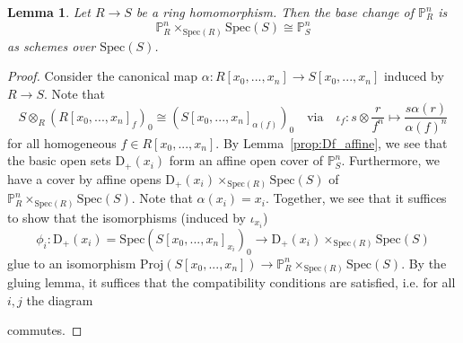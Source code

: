 \documentclass{scrartcl}
\newcommand{\D}[1]{\mathrm{D}_+(#1)}
\renewcommand{\P}{\mathbb{P}}
\newcommand{\Spec}{\mathrm{Spec}}
\newcommand{\Proj}{\mathrm{Proj}}
\newtheorem{lemma}[subsection]{Lemma}
\theoremstyle{definition}
\begin{document}
\begin{lemma}
    \label{prop:projective_space_base_change}
    Let $R \to S$ be a ring homomorphism.
    Then the base change of $\P_R^n$ is
    \begin{equation*}
        \P_R^n \times_{\Spec(R)} \Spec(S) \cong \P_S^n
    \end{equation*}
    as schemes over $\Spec(S)$.
\end{lemma}
\begin{proof}
    Consider the canonical map $\alpha: R[x_0, ..., x_n] \to S[x_0, ..., x_n]$ induced by $R \to S$.
    Note that
    \begin{equation*}
        S \otimes_R (R[x_0, ..., x_n]_f)_0 \cong (S[x_0, ..., x_n]_{\alpha(f)})_0 \quad \text{via} \quad \iota_f: s \otimes \frac r {f^n} \mapsto \frac {s\alpha(r)} {\alpha(f)^n}
    \end{equation*}
    for all homogeneous $f \in R[x_0, ..., x_n]$.
    By Lemma~\ref{prop:Df_affine}, we see that the basic open sets $\D{x_i}$ form an affine open cover of $\P_S^n$.
    Furthermore, we have a cover by affine opens $\D{x_i} \times_{\Spec(R)} \Spec(S)$ of $\P_R^n \times_{\Spec(R)} \Spec(S)$.
    Note that $\alpha(x_i) = x_i$.
    Together, we see that it suffices to show that the isomorphisms (induced by $\iota_{x_i}$)
    \begin{equation*}
        \phi_i: \D{x_i} = \Spec(S[x_0, ..., x_n]_{x_i})_0 \to \D{x_i} \times_{\Spec(R)} \Spec(S)
    \end{equation*}
    glue to an isomorphism $\Proj(S[x_0, ..., x_n]) \to \P_R^n \times_{\Spec(R)} \Spec(S)$.
    By the gluing lemma, it suffices that the compatibility conditions are satisfied, i.e. for all $i, j$ the diagram
    \begin{center}
    \end{center}
    commutes.


\end{proof}
\end{document}
